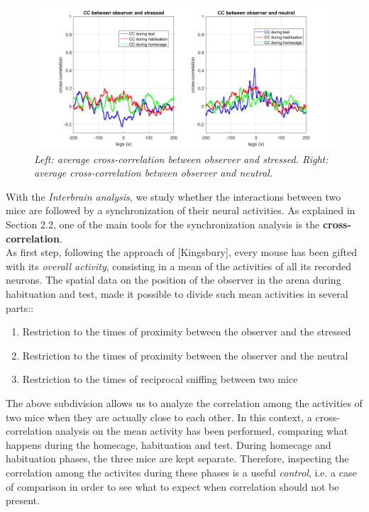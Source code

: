 \documentclass[12pt, a4paper]{article}
\begin{document}
\begin{figure}[H]
	
	\begin{center}
		\hspace*{-1.4cm}
		\includegraphics[scale=.4]{average_cc.png} 
	\end{center} 
	\caption{\textit{Left: average cross-correlation between observer and stressed. Right: average cross-correlation between observer and neutral.}} \label{cc}
	
\end{figure}

With the \textit{Interbrain analysis}, we study whether the interactions between two mice are followed by a synchronization of their neural activities. As explained in Section 2.2, one of the main tools for the synchronization analysis is the \textbf{cross-correlation}.\\
As first step, following the approach of [Kingsbury], every mouse has been gifted with its \textit{overall activity}, consisting in a mean of the activities of all its recorded neurons. The spatial data on the position of the observer in the arena during habituation and test, made it possible to divide such mean activities in several parts::

\begin{enumerate}
	\item Restriction to the times of proximity between the observer and the stressed
	\item Restriction to the times of proximity between the observer and the neutral
	\item Restriction to the times of reciprocal sniffing between two mice
\end{enumerate}

The above subdivision allows us to analyze the correlation among the activities of two mice when they are actually close to each other. In this context, a cross-correlation analysis on the mean activity has been performed, comparing what happens during the homecage, habituation and test. During homecage and habituation phases, the three mice are kept separate. Therefore, inspecting the correlation among the activites during these phases is a useful \textit{control}, i.e. a case of comparison in order to see what to expect when correlation should not be present.
\\
\end{document}
